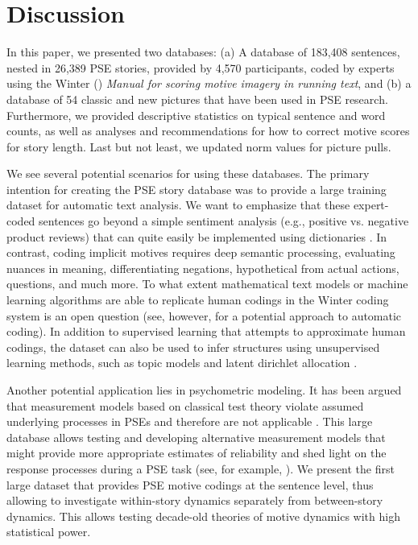 \documentclass[man,a4paper,mask]{apa6}\usepackage[]{graphicx}\usepackage[]{color}
\begin{document}
\section{Discussion}

In this paper, we presented two databases: (a) A database of 183,408 sentences, nested in 26,389 PSE stories, provided by 4,570 participants, coded by experts using the Winter (\citeyear{winter_ManualScoringMotive_1994}) \emph{Manual for scoring motive imagery in running text}, and (b) a database of 54 classic and new pictures that have been used in PSE research. Furthermore, we provided descriptive statistics on typical sentence and word counts, as well as analyses and recommendations for how to correct motive scores for story length. Last but not least, we updated norm values for picture pulls.

We see several potential scenarios for using these databases. The primary intention for creating the PSE story database was to provide a large training dataset for automatic text analysis. We want to emphasize that these expert-coded sentences go beyond a simple sentiment analysis (e.g., positive vs. negative product reviews) that can quite easily be implemented using dictionaries \parencite[e.g.,][]{feldman_TechniquesApplicationsSentiment_2013}. In contrast, coding implicit motives requires deep semantic processing, evaluating nuances in meaning, differentiating negations, hypothetical from actual actions, questions, and much more. To what extent mathematical text models or machine learning algorithms are able to replicate human codings in the Winter coding system is an open question (see, however,  for a potential approach to automatic coding). In addition to supervised learning that attempts to approximate human codings, the dataset can also be used to infer structures using unsupervised learning methods, such as topic models and latent dirichlet allocation \parencite{blei_LatentDirichletAllocation_2003}.

Another potential application lies in psychometric modeling. It has been argued that measurement models based on classical test theory violate assumed underlying processes in PSEs and therefore are not applicable \parencite{atkinson_studying_1981,hibbard_critique_2003,schultheiss_reliability_2008}. This large database allows testing and developing alternative measurement models that might provide more appropriate estimates of reliability and shed light on the response processes during a PSE task (see, for example, ). We present the first large dataset that provides PSE motive codings at the sentence level, thus allowing to investigate within-story dynamics separately from between-story dynamics. This allows testing decade-old theories of motive dynamics with high statistical power. 
\end{document}
